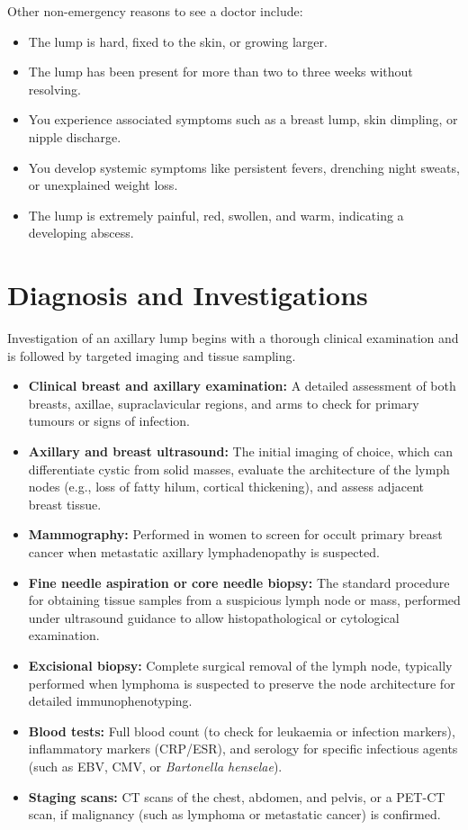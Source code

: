Other non-emergency reasons to see a doctor include:
\begin{itemize}
    \item The lump is hard, fixed to the skin, or growing larger.
    \item The lump has been present for more than two to three weeks without resolving.
    \item You experience associated symptoms such as a breast lump, skin dimpling, or nipple discharge.
    \item You develop systemic symptoms like persistent fevers, drenching night sweats, or unexplained weight loss.
    \item The lump is extremely painful, red, swollen, and warm, indicating a developing abscess.
\end{itemize}

\section*{Diagnosis and Investigations}
Investigation of an axillary lump begins with a thorough clinical examination and is followed by targeted imaging and tissue sampling.
\begin{itemize}
    \item \textbf{Clinical breast and axillary examination:} A detailed assessment of both breasts, axillae, supraclavicular regions, and arms to check for primary tumours or signs of infection.
    \item \textbf{Axillary and breast ultrasound:} The initial imaging of choice, which can differentiate cystic from solid masses, evaluate the architecture of the lymph nodes (e.g., loss of fatty hilum, cortical thickening), and assess adjacent breast tissue.
    \item \textbf{Mammography:} Performed in women to screen for occult primary breast cancer when metastatic axillary lymphadenopathy is suspected.
    \item \textbf{Fine needle aspiration or core needle biopsy:} The standard procedure for obtaining tissue samples from a suspicious lymph node or mass, performed under ultrasound guidance to allow histopathological or cytological examination.
    \item \textbf{Excisional biopsy:} Complete surgical removal of the lymph node, typically performed when lymphoma is suspected to preserve the node architecture for detailed immunophenotyping.
    \item \textbf{Blood tests:} Full blood count (to check for leukaemia or infection markers), inflammatory markers (CRP/ESR), and serology for specific infectious agents (such as EBV, CMV, or \textit{Bartonella henselae}).
    \item \textbf{Staging scans:} CT scans of the chest, abdomen, and pelvis, or a PET-CT scan, if malignancy (such as lymphoma or metastatic cancer) is confirmed.
\end{itemize}

